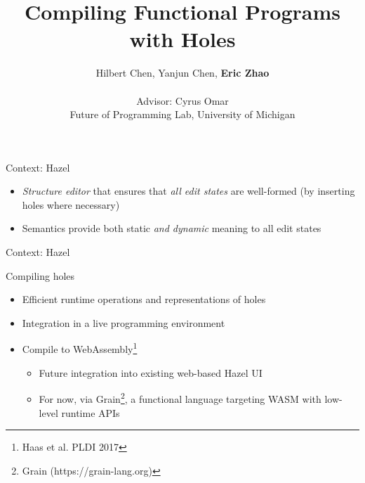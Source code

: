 \documentclass[aspectratio=169, xcolor={dvipsnames}, xtable]{beamer}
\title{Compiling Functional Programs with Holes}
\subtitle{}
\author{Hilbert Chen, Yanjun Chen, \textbf{Eric Zhao} \\\\
Advisor: Cyrus Omar \\
Future of Programming Lab, University of Michigan}
\date{}
\begin{document}

\newcommand{\currenttitle}{}

\maketitle

\renewcommand{\currenttitle}{Context: Hazel}
\begin{frame}{\currenttitle}
  \begin{itemize}
    \item<+-> \emph{Structure editor} that ensures that \emph{all edit states} are well-formed (by
      inserting holes where necessary)
    \item<+-> Semantics provide both static \emph{and dynamic} meaning to all edit states
  \end{itemize}
\end{frame}

\begin{frame}{\currenttitle}

\end{frame}

\renewcommand{\currenttitle}{Compiling holes}
\begin{frame}{\currenttitle}
  \begin{itemize}
    \item<2-> Efficient runtime operations and representations of holes
    \item<3-> Integration in a live programming environment
    \item<4-> Compile to WebAssembly\footnote<4->{Haas et al. PLDI 2017} 
      \begin{itemize}
        \item Future integration into existing web-based Hazel UI
        \item For now, via Grain\footnote<3->{Grain (https://grain-lang.org)}, a functional language
          targeting WASM with low-level runtime APIs
      \end{itemize}
  \end{itemize}
\end{frame}
\end{document}
